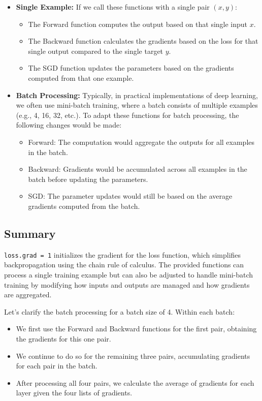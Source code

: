 \documentclass{article}
\begin{document}
\begin{itemize}
    \item \textbf{Single Example:} If we call these functions with a single pair \((x,y)\):
    \begin{itemize}
        \item The Forward function computes the output based on that single input \(x\).
        \item The Backward function calculates the gradients based on the loss for that single output compared to the single target \(y\).
        \item The SGD function updates the parameters based on the gradients computed from that one example.
    \end{itemize}
    \item \textbf{Batch Processing:} Typically, in practical implementations of deep learning, we often use mini-batch training, where a batch consists of multiple examples (e.g., 4, 16, 32, etc.). To adapt these functions for batch processing, the following changes would be made:
    \begin{itemize}
        \item Forward: The computation would aggregate the outputs for all examples in the batch.
        \item Backward: Gradients would be accumulated across all examples in the batch before updating the parameters.
        \item SGD: The parameter updates would still be based on the average gradients computed from the batch.
    \end{itemize}
\end{itemize}

\subsection{Summary}
\texttt{loss.grad = 1} initializes the gradient for the loss function, which simplifies backpropagation using the chain rule of calculus. The provided functions can process a single training example but can also be adjusted to handle mini-batch training by modifying how inputs and outputs are managed and how gradients are aggregated. 

Let’s clarify the batch processing for a batch size of 4. Within each batch:
\begin{itemize}
    \item We first use the Forward and Backward functions for the first pair, obtaining the gradients for this one pair.
    \item We continue to do so for the remaining three pairs, accumulating gradients for each pair in the batch.
    \item After processing all four pairs, we calculate the average of gradients for each layer given the four lists of gradients.
\end{itemize}
\end{document}
